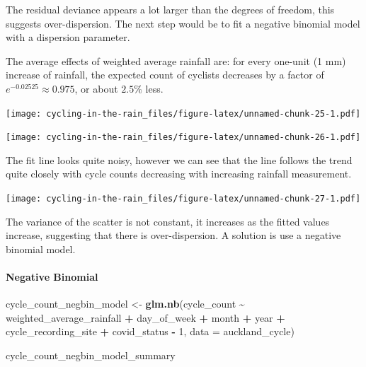 \documentclass[
]{article}
\newenvironment{Shaded}{\begin{snugshade}}{\end{snugshade}}
\newcommand{\AttributeTok}[1]{\textcolor[rgb]{0.13,0.29,0.53}{#1}}
\newcommand{\DecValTok}[1]{\textcolor[rgb]{0.00,0.00,0.81}{#1}}
\newcommand{\FunctionTok}[1]{\textcolor[rgb]{0.13,0.29,0.53}{\textbf{#1}}}
\newcommand{\NormalTok}[1]{#1}
\newcommand{\OtherTok}[1]{\textcolor[rgb]{0.56,0.35,0.01}{#1}}
\newcommand{\SpecialCharTok}[1]{\textcolor[rgb]{0.81,0.36,0.00}{\textbf{#1}}}
\begin{document}
The residual deviance appears a lot larger than the degrees of freedom,
this suggests over-dispersion. The next step would be to fit a negative
binomial model with a dispersion parameter.

The average effects of weighted average rainfall are: for every one-unit
(1 mm) increase of rainfall, the expected count of cyclists decreases by
a factor of \(e^{-0.02525} \approx 0.975\), or about \(2.5\%\) less.

\texttt{[image: cycling-in-the-rain\_files/figure-latex/unnamed-chunk-25-1.pdf]}

\texttt{[image: cycling-in-the-rain\_files/figure-latex/unnamed-chunk-26-1.pdf]}

The fit line looks quite noisy, however we can see that the line follows
the trend quite closely with cycle counts decreasing with increasing
rainfall measurement.

\texttt{[image: cycling-in-the-rain\_files/figure-latex/unnamed-chunk-27-1.pdf]}

The variance of the scatter is not constant, it increases as the fitted
values increase, suggesting that there is over-dispersion. A solution is
use a negative binomial model.

\hypertarget{negative-binomial}{%
\paragraph{Negative Binomial}\label{negative-binomial}}

\begin{Shaded}
\begin{Highlighting}[]
\NormalTok{cycle\_count\_negbin\_model }\OtherTok{\textless{}{-}} \FunctionTok{glm.nb}\NormalTok{(cycle\_count }\SpecialCharTok{\textasciitilde{}}\NormalTok{ weighted\_average\_rainfall }\SpecialCharTok{+}\NormalTok{ day\_of\_week }\SpecialCharTok{+}\NormalTok{ month }\SpecialCharTok{+}\NormalTok{ year }\SpecialCharTok{+}\NormalTok{ cycle\_recording\_site }\SpecialCharTok{+}\NormalTok{ covid\_status }\SpecialCharTok{{-}} \DecValTok{1}\NormalTok{, }\AttributeTok{data =}\NormalTok{ auckland\_cycle)}
\end{Highlighting}
\end{Shaded}

\begin{Shaded}
\begin{Highlighting}[]
\NormalTok{cycle\_count\_negbin\_model\_summary}
\end{Highlighting}
\end{Shaded}
\end{document}

